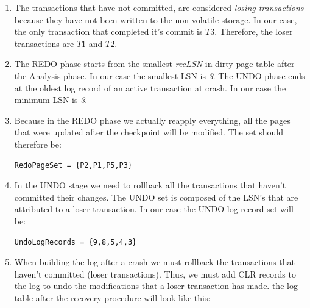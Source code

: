 \documentclass{article}      %
\begin{document}
\begin{enumerate}
\item %
The transactions that have not committed, are considered \emph{losing transactions} because they have not been written to the non-volatile storage. In our case, the only transaction that completed it's commit is $T3$. Therefore, the loser transactions are $T1$ and $T2$.\\

\item %
The REDO phase starts from the smallest \emph{recLSN} in dirty page table after the Analysis phase. In our case the smallest LSN is \emph{3}. The UNDO phase ends at the oldest log record of an active transaction at crash. In our case the minimum LSN is \emph{3}.\\

\item %
Because in the REDO phase we actually reapply everything, all the pages that were updated after the checkpoint will be modified. The set should therefore be:
\begin{verbatim}
RedoPageSet = {P2,P1,P5,P3}
\end{verbatim}

\item %
In the UNDO stage we need to rollback all the transactions that haven't committed their changes. The UNDO set is composed of the LSN's that are attributed to a loser transaction. In our case the UNDO log record set will be:
\begin{verbatim}
UndoLogRecords = {9,8,5,4,3}
\end{verbatim}

\item %
When building the log after a crash we must rollback the transactions that haven't committed (loser transactions). Thus, we must add CLR records to the log to undo the modifications that a loser transaction has made. the log table after the recovery procedure will look like this:


\end{enumerate}
\end{document}
